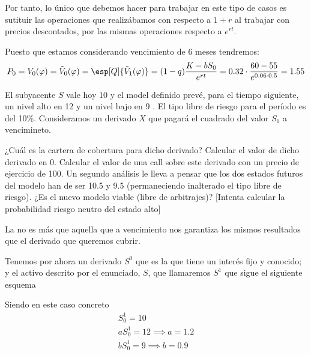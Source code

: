 \begin{problem}[1]
Por tanto, lo único que debemos hacer para trabajar en este tipo de casos es sutituir las operaciones que realizábamos con respecto a $1+r$ al trabajar con precios descontados, por las mismas operaciones respecto a $e^{rt}$.

Puesto que estamos considerando vencimiento de 6 meses tendremos:
\[P_0 = V_0(\varphi) = \tilde{V}_0(\varphi) = \esp[Q]{\tilde{V}_1(\varphi)} = (1-q) \frac{K-bS_0}{e^{rt}} = 0.32 \cdot \frac{60-55}{e^{0.06\cdot 0.5}}=1.55\]
\end{problem}

\begin{problem}[2]
El subyacente $S$ vale hoy 10 \texteuro y el model definido prevé, para el tiempo siguiente, un nivel alto en 12 \texteuro y un nivel bajo en 9 \texteuro. El tipo libre de riesgo para el período es del 10\%. Consideramos un derivado $X$ que pagará el cuadrado del valor $S_1$ a vencimineto.

\ppart ¿Cuál es la cartera de cobertura para dicho derivado?
\ppart Calcular el valor de dicho derivado en 0.
\ppart Calcular el valor de una call sobre este derivado con un precio de ejercicio de 100.
\ppart Un segundo análisis le lleva a pensar que los dos estados futuros del modelo han de ser 10.5 y 9.5 (permaneciendo inalterado el tipo libre de riesgo). ¿Es el nuevo modelo viable (libre de arbitrajes)? [Intenta calcular la probabilidad riesgo neutro del estado alto]

\solution

\spart

La  no es más que aquella que a vencimiento nos garantiza los mismos resultados que el derivado que queremos cubrir.

Tenemos por ahora un derivado $S^0$ que es la  que tiene un interés fijo y conocido; y el activo descrito por el enunciado, $S$, que llamaremos $S^1$ que sigue el siguiente esquema

\begin{minipage}{0.48\textwidth}
\begin{center}
\end{center}
\end{minipage}
\begin{minipage}{0.48\textwidth}
Siendo en este caso concreto
\[\begin{array}{l}
S_0^1 = 10 \\
aS_0^1 = 12 \implies a = 1.2 \\
bS_0^1 = 9 \implies b = 0.9
\end{array}\]
\end{minipage}


\end{problem}
